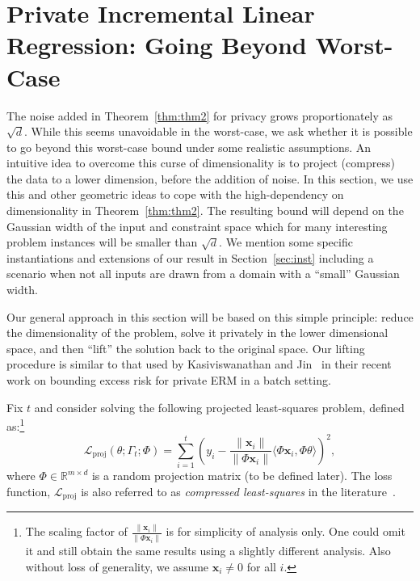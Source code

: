 \documentclass{article}
\theoremstyle{plain}
\def \LLL {\mathcal{L}}
\def \proj {{\mathrm{proj}}}
\def \x {\mathbf x}
\def \R {\mathbb{R}}
\begin{document}
\section{Private Incremental Linear Regression: Going Beyond Worst-Case} \label{sec:width}
The noise added in Theorem~\ref{thm:thm2} for privacy grows proportionately as $\sqrt{d}$. While this seems unavoidable in the worst-case, we ask whether it is possible to go beyond this worst-case bound under some realistic assumptions. An intuitive idea to overcome this curse of dimensionality is to project (compress) the data to a lower dimension, before the addition of noise. In this section, we use this and other geometric ideas to cope with the high-dependency on dimensionality in Theorem~\ref{thm:thm2}. The resulting bound will depend on the Gaussian width of the input and constraint space which for many interesting problem instances will be smaller than $\sqrt{d}$. We mention some specific instantiations and extensions of our result in Section~\ref{sec:inst} including a scenario when not all inputs are drawn from a domain with a ``small'' Gaussian width. 

Our general approach in this section will be based on this simple principle: reduce the dimensionality of the problem, solve it privately in the lower dimensional space, and then ``lift'' the solution back to the original space. Our lifting procedure is similar to that used by Kasiviswanathan and Jin~\cite{kasiviswanathanicml} in their recent work on bounding excess risk for private ERM in a batch setting. 

Fix $t$ and consider solving the following projected least-squares problem, defined as:\!\footnote{The scaling factor of $\frac{\| \x_i \|}{\| \Phi \x_i \|}$ is for simplicity of analysis only. One could omit it and still obtain the same results using a slightly different analysis. Also without loss of generality, we assume $\x_i \neq 0$ for all $i$.}
\begin{equation}\label{eqn:JLtransform}
\LLL_\proj(\theta;\Gamma_t;\Phi) = \sum_{i=1}^t \left (y_i - \frac{\| \x_i \|}{\| \Phi \x_i \|} \langle \Phi \x_i, \Phi \theta \rangle \right )^2,
\end{equation}
where $\Phi \in \R^{m \times d}$ is a random projection matrix (to be defined later). The loss function, $\LLL_\proj$ is also referred to as {\em compressed least-squares} in the literature~\cite{maillard2009compressed,fard2012compressed,kaban2014new}.
\end{document}
